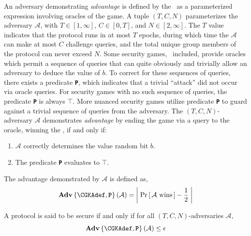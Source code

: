 An adversary demonstrating \emph{advantage} is defined by the \CGKAsec\ as a parameterized expression involving oracles of the game.
A tuple \((T, C, N)\) parameterizes the adversary \(\mathcal{A}\), with \(T \in \left[1, \infty \right]\), \(C \in \left[0, T \right]\), and \(N \in \left[2, \infty \right]\).
The \(T\) value indicates that the protocol runs in at most \(T\) epochs, during which time the \(\mathcal{A}\) can make at most \(C\) challenge queries, and the total unique group members of the protocol can never exceed \(N\).
Some security games, \CGKAsec\ included, provide oracles which permit a sequence of queries that can quite obviously and trivially allow an adversary to deduce the value of \(b\).
To correct for these sequences of queries, there exists a predicate \textbf{\texttt{P}}, which indicates that a trivial ``attack'' did not occur via oracle queries.
For security games with no such sequence of queries, the predicate \textbf{\texttt{P}} is always \(\top\).
More nuanced security games utilize predicate \textbf{\texttt{P}} to guard against a trivial sequence of queries from the adversary.
The \((T, C, N)\)-adversary \(\mathcal{A}\) demonstrates \emph{advantage} by ending the game via a query to the  oracle, winning the \CGKAsec, if and only if:

\begin{enumerate}
\item \(\mathcal{A}\) correctly determines the value random bit \(b\).
\item The predicate \textbf{\texttt{P}} evaluates to \(\top\).
\end{enumerate}
\vspace{\parsep}

\begin{definition}\label{def:CGKA-Advantage}
The advantage demonstrated by $\mathcal{A}$ is defined as,
\[ \normalfont{\textbf{Adv}}\left\{\CGKAdef,\textbf{\texttt{P}}\right\}(\mathcal{A})  = \left|\; \Pr\left[ \,\mathcal{A}\text{ wins}\, \right] - \frac{1}{2} \;\right| \]
\end{definition}

\begin{definition}\label{def:CGKA-Security}
A  protocol is said to be secure if and only if for all $(T, C, N)$-adversaries $\mathcal{A}$,
\[ \normalfont\textbf{Adv}\left\{\CGKAdef,\textbf{\texttt{P}}\right\}(\mathcal{A}) \leq \epsilon \]
\end{definition}

